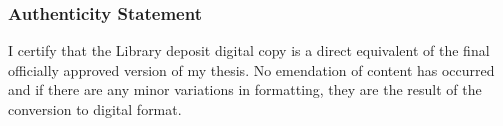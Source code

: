 \cleardoublepage
\vspace*{1in}
\subsubsection*{Authenticity Statement}

I certify that the Library deposit digital copy is a direct equivalent
of the final officially approved version of my thesis. No emendation of content
has occurred and if there are any minor variations in formatting, they are the
result of the conversion to digital format.

\vspace{5mm}
\noindent{}

